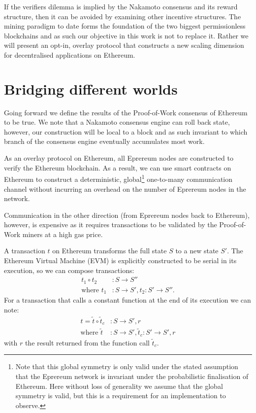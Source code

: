 \documentclass[twocolumn]{article}
\begin{document}
If the verifiers dilemma is implied by the Nakamoto consensus and its reward structure, then it can be avoided by examining other incentive structures.  The mining paradigm to date forms the foundation of the two biggest permissionless blockchains %
and as such our objective in this work is not to replace it.  Rather we will present an opt-in, overlay protocol that constructs a new scaling dimension for decentralised applications on Ethereum.


\section{Bridging different worlds}

Going forward we define the results of the Proof-of-Work consensus of Ethereum to be true.  We note that a Nakamoto consensus engine can roll back state, however, our construction will be local to a block and as such invariant to which branch of the consensus engine eventually accumulates most work.

As an overlay protocol on Ethereum, all Eprereum nodes are constructed to verify the Ethereum blockchain.  As a result, we can use smart contracts on Ethereum to construct a deterministic, global\footnote{Note that this global symmetry is only valid under the stated assumption that the Eprereum network is invariant under the probabilistic finalisation of Ethereum.  Here without loss of generality we assume that the global symmetry is valid, but this is a requirement for an implementation to observe.} one-to-many communication channel without incurring an overhead on the number of Eprereum nodes in the network.

Communication in the other direction (from Eprereum nodes back to Ethereum), however, is expensive as it requires transactions to be validated by the Proof-of-Work miners at a high gas price.

A transaction $t$ on Ethereum transforms the full state $S$ to a new state $S'$.  The Ethereum Virtual Machine (EVM) is explicitly constructed to be serial in its execution, so we can compose transactions:
\begin{align}
	t_1 \circ t_2&: S \rightarrow S'' \\
	\text{where } t_1&: S \rightarrow S',
	t_2: S' \rightarrow S''. \nonumber
\end{align}
For a transaction that calls a constant function at the end of its execution we can note:
\begin{align}
	t = \tilde{t} \circ \tilde{t}_c&: S \rightarrow S', r \\
	\text{where } \tilde{t}&: S \rightarrow S', \tilde{t}_c: S' \rightarrow S', r \nonumber
\end{align}
with $r$ the result returned from the function call $\tilde{t}_c$.
\end{document}
